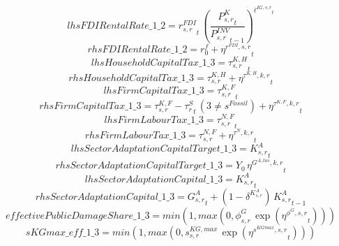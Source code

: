 \begin{dmath*}
lhsFDIRentalRate\_1\_2 = {{r^{FDI}_{s,r}}}_{t}\, \left(\frac{{{P^K_{s,r}}}_{t}}{{{P^{INV}_{s,r}}}_{t-1}}\right)^{{{\ell^{IG,s,r}}}_{t}}
\end{dmath*}
\begin{dmath*}
rhsFDIRentalRate\_1\_2 = {{r^f_0}}+{{\eta^{r^{FDI},s,r}}}_{t}
\end{dmath*}
\begin{dmath*}
lhsHouseholdCapitalTax\_1\_3 = {{\tau^{K,H}_{s,r}}}_{t}
\end{dmath*}
\begin{dmath*}
rhsHouseholdCapitalTax\_1\_3 = {{\tau^{K,H}_{s,r}}}+{{\eta^{\tau^{K,H},k,r}}}_{t}
\end{dmath*}
\begin{dmath*}
lhsFirmCapitalTax\_1\_3 = {{\tau^{K,F}_{s,r}}}_{t}
\end{dmath*}
\begin{dmath*}
rhsFirmCapitalTax\_1\_3 = {{\tau^{K,F}_{s,r}}}-{{\tau^{S}_{r}}}_{t}\, \left(3\neq {{s^{Fossil}}}\right)+{{\eta^{\tau^{K,F},k,r}}}_{t}
\end{dmath*}
\begin{dmath*}
lhsFirmLabourTax\_1\_3 = {{\tau^{N,F}_{s,r}}}_{t}
\end{dmath*}
\begin{dmath*}
rhsFirmLabourTax\_1\_3 = {{\tau^{N,F}_{s,r}}}+{{\eta^{\tau^{N},k,r}}}_{t}
\end{dmath*}
\begin{dmath*}
lhsSectorAdaptationCapitalTarget\_1\_3 = {{K^{A}_{s,r}}}_{t}
\end{dmath*}
\begin{dmath*}
rhsSectorAdaptationCapitalTarget\_1\_3 = {{Y_0}}\, {{\eta^{G^{A,tas},k,r}}}_{t}
\end{dmath*}
\begin{dmath*}
lhsSectorAdaptationCapital\_1\_3 = {{K^{A}_{s,r}}}_{t}
\end{dmath*}
\begin{dmath*}
rhsSectorAdaptationCapital\_1\_3 = {{G^{A}_{s,r}}}_{t}+\left(1-{{\delta^{K^{A}_{s,r}}}}\right)\, {{K^{A}_{s,r}}}_{t-1}
\end{dmath*}
\begin{dmath*}
effectivePublicDamageShare\_1\_3 = min(1,max(0,{{\phi^{G}_{s,r}}}\, \exp\left({{\eta^{\phi^{G},s,r}}}_{t}\right)))
\end{dmath*}
\begin{dmath*}
sKGmax\_eff\_1\_3 = min(1,max(0,{{s^{KG,max}_{s,r}}}\, \exp\left({{\eta^{s^{KGmax},s,r}}}_{t}\right)))
\end{dmath*}
